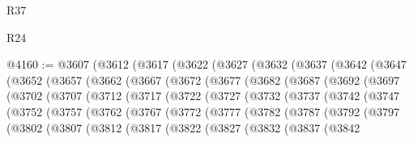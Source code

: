 \begin{lexlean}{R37}
\begin{lexlean}{R24}
\begin{coremodule}
{{{{{{{{{{{{{{{{{{{{{{{{{{{{{{{{{{{{{{{{{{{{{{{{{{{{{{{{{{{{{{{{{{{{{{{{{{{{{{{{{{{{{{{{{{{{{{{{{{{{{{{{{{{{{{{{{{{{{{{{{{{{{{{{{{{{{{{{{{{{{{{{{{{{{{{{{{{{{{{{{{{{{{{{{{{{{{{{{{{{{{{{{@4160 := @3607
    (@3612
      (@3617
        (@3622
          (@3627
            (@3632
              (@3637
                (@3642
                  (@3647
                    (@3652
                      (@3657
                        (@3662
                          (@3667
                            (@3672
                              (@3677
                                (@3682
                                  (@3687
                                    (@3692
                                      (@3697
                                        (@3702
                                          (@3707
                                            (@3712
                                              (@3717
                                                (@3722
                                                  (@3727
                                                    (@3732
                                                      (@3737
                                                        (@3742
                                                          (@3747
                                                            (@3752
                                                              (@3757
                                                                (@3762
                                                                  (@3767
                                                                    (@3772
                                                                      (@3777
                                                                        (@3782
                                                                          (@3787
                                                                            (@3792
                                                                              (@3797
                                                                                (@3802
                                                                                  (@3807
                                                                                    (@3812
                                                                                      (@3817
                                                                                        (@3822
                                                                                          (@3827
                                                                                            (@3832
                                                                                              (@3837
                                                                                                (@3842
}}}}}}}}}}}}}}}}}}}}}}}}}}}}}}}}}}}}}}}}}}}}}}}}}}}}}}}}}}}}}}}}}}}}}}}}}}}}}}}}}}}}}}}}}}}}}}}}}}}}}}}}}}}}}}}}}}}}}}}}}}}}}}}}}}}}}}}}}}}}}}}}}}}}}}}}}}}}}}}}}}}}}}}}}}}}}}}}}}}}}}}}}
\end{coremodule}
\end{lexlean}
\end{lexlean}
